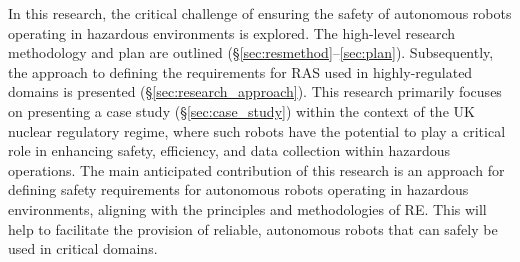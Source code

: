\documentclass[conference]{IEEEtran}
\newcommand{\marienote}[1]{\todo[color=orange!65,inline]{Marie: #1}}
\begin{document}
In this research, the critical challenge of ensuring the safety of autonomous robots operating in hazardous environments is explored. The high-level research methodology and plan are outlined (\S\ref{sec:resmethod}--\ref{sec:plan}). Subsequently, the approach to defining the requirements for RAS used in highly-regulated domains is presented (\S\ref{sec:research_approach}). This research primarily focuses on presenting a case study (\S\ref{sec:case_study}) within the context of the UK nuclear regulatory regime, where such robots have the potential to play a critical role in enhancing safety, efficiency, and data collection within hazardous operations. The main anticipated contribution of this research is an approach for defining safety requirements for autonomous robots operating in hazardous environments, aligning with the principles and methodologies of RE. This will help to facilitate the provision of reliable, autonomous robots that can safely be used in critical domains. %
\end{document}
